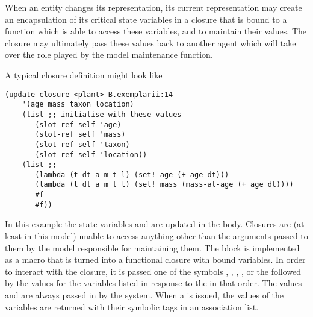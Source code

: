When an entity changes its representation, its current representation
may create an encapsulation of its critical state variables in a
closure that is bound to a function which is able to access these
variables, and to maintain their values. The closure may ultimately pass these
values back to another agent which will take over the role played by
the model maintenance function.

A typical closure definition might look like
\begin{verbatim}
(update-closure <plant>-B.exemplarii:14 
    '(age mass taxon location)
    (list ;; initialise with these values
       (slot-ref self 'age)
       (slot-ref self 'mass)
       (slot-ref self 'taxon)
       (slot-ref self 'location))
    (list ;; 
       (lambda (t dt a m t l) (set! age (+ age dt)))
       (lambda (t dt a m t l) (set! mass (mass-at-age (+ age dt))))
       #f
       #f))

\end{verbatim}
In this example the state-variables  and 
are updated in the body.  Closures are (at least in this model) unable
to access anything other than the arguments passed to them by the
model responsible for maintaining them.  The 
block is implemented as a macro that is turned into a functional
closure with bound variables.  In order to interact with the closure,
it is passed one of the
symbols , ,
, ,  or the
 followed by the values for the variables
listed in response to the  in that order.  The
values  and  are always passed in by the
system.  When a  is issued, the values of the variables
are returned with their symbolic tags in an association list.




